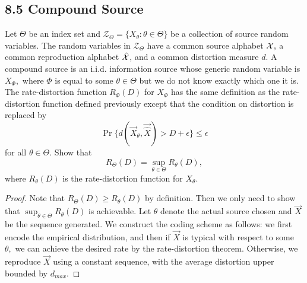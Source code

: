 \documentclass[../main.tex]{subfiles}
\begin{document}
\subsection*{8.5 Compound Source}
Let $\Theta$ be an index set and $\mathcal{Z}_{\Theta}=\{X_{\theta}: \theta \in \Theta\}$ be a collection of source random variables. The random variables in $\mathcal{Z}_\Theta$ have a common source alphabet $\mathcal{X},$ a common reproduction alphabet $\hat {\mathcal{X}}$, and a common distortion measure $d.$ A compound source is an i.i.d. information source whose generic random variable is $X_{\Phi},$ where $\Phi$ is equal to some $\theta \in \Theta$ but we do not know exactly which one it is. The rate-distortion function $R_{\Phi}(D)$ for $X_\Phi$ has the same definition as the rate-distortion function defined previously except that the condition on distortion is replaced by \[
\Pr\{d(\vec X_\theta, \vec{\hat X}) > D+\epsilon\} \leq \epsilon
\] for all $\theta \in \Theta.$
Show that \[
R_\Theta(D) = \sup_{\theta\in \Theta}R_{\theta}(D),
\] where $R_\theta(D)$ is the rate-distortion function for $X_\theta.$
\begin{proof}
    Note that $R_\Theta(D)\geq R_{\theta}(D)$ by definition. Then we only need to show that $\sup_{\theta\in \Theta}R_{\theta}(D)$ is achievable. Let $\theta$ denote the actual source chosen and $\vec X$ be the sequence generated. We construct the coding scheme as follows:
    \newline
    we first encode the empirical distribution, and then if $\vec X$ is typical with respect to some $\theta,$ we can achieve the desired rate by the rate-distortion theorem. Otherwise, we reproduce $\vec X$ using a constant sequence, with the average distortion upper bounded by $d_{max}.$
\end{proof}
\end{document}
